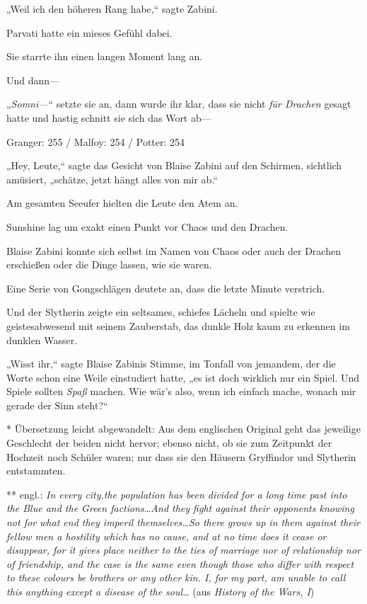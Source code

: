 {„Weil ich den höheren Rang habe,“ sagte Zabini.

Parvati hatte ein mieses Gefühl dabei.

Sie starrte ihn einen langen Moment lang an.

Und dann—

„\emph{Somni—}“ setzte sie an, dann wurde ihr klar, dass sie nicht \emph{für Drachen} gesagt hatte und hastig schnitt sie sich das Wort ab—

\later

Granger: 255 / Malfoy: 254 / Potter: 254

„Hey, Leute,“ sagte das Gesicht von Blaise Zabini auf den Schirmen, sichtlich amüsiert, „schätze, jetzt hängt alles von mir ab.“

Am gesamten Seeufer hielten die Leute den Atem an.

Sunshine lag um exakt einen Punkt vor Chaos und den Drachen.

Blaise Zabini konnte sich selbst im Namen von Chaos oder auch der Drachen erschießen oder die Dinge lassen, wie sie waren.

Eine Serie von Gongschlägen deutete an, dass die letzte Minute verstrich.

Und der Slytherin zeigte ein seltsames, schiefes Lächeln und spielte wie geistesabwesend mit seinem Zauberstab, das dunkle Holz kaum zu erkennen im dunklen Wasser.

„Wisst ihr,“ sagte Blaise Zabinis Stimme, im Tonfall von jemandem, der die Worte schon eine Weile einstudiert hatte, „es ist doch wirklich nur ein Spiel. Und Spiele sollten \emph{Spaß} machen. Wie wär's also, wenn ich einfach mache, wonach mir gerade der Sinn steht?“

* Übersetzung leicht abgewandelt: Aus dem englischen Original geht das jeweilige Geschlecht der beiden nicht hervor; ebenso nicht, ob sie zum Zeitpunkt der Hochzeit noch Schüler waren; nur dass sie den Häusern Gryffindor und Slytherin entstammten.

** engl.: \emph{In every city,the population has been divided for a long time past into the Blue and the Green factions…And they fight against their opponents knowing not for what end they imperil themselves…So there grows up in them against their fellow men a hostility which has no cause, and at no time does it cease or disappear, for it gives place neither to the ties of marriage nor of relationship nor of friendship, and the case is the same even though those who differ with respect to these colours be brothers or any other kin. I, for my part, am unable to call this anything except a disease of the soul…} (aus \emph{History of the Wars, I})

}
